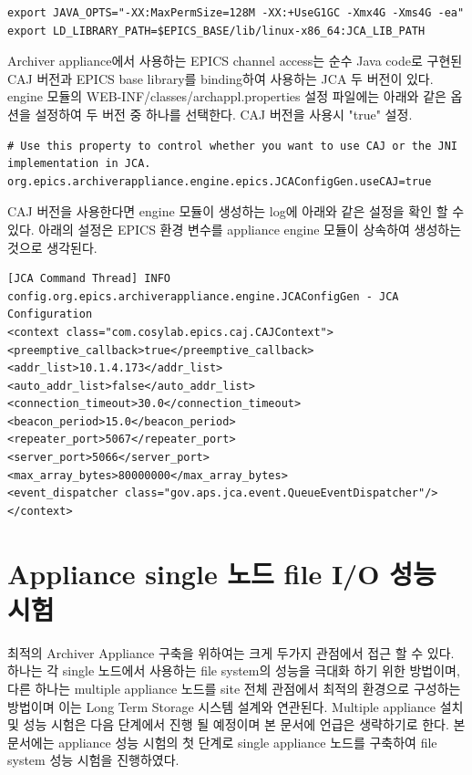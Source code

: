\documentclass[11pt
  , a4paper
  , article
  , oneside
]{memoir}
\begin{document}
\begin{lstlisting}[style=termstyle]
export JAVA_OPTS="-XX:MaxPermSize=128M -XX:+UseG1GC -Xmx4G -Xms4G -ea"
export LD_LIBRARY_PATH=$EPICS_BASE/lib/linux-x86_64:JCA_LIB_PATH
\end{lstlisting}

Archiver appliance에서 사용하는 EPICS channel access는 순수 Java code로 구현된 CAJ 버전과 EPICS base library를 binding하여 사용하는 JCA 두 버전이 있다. engine 모듈의 WEB-INF/classes/archappl.properties 설정 파일에는 아래와 같은 옵션을 설정하여 두 버전 중 하나를 선택한다. CAJ 버전을 사용시 "true" 설정.
\begin{lstlisting}[style=termstyle]
# Use this property to control whether you want to use CAJ or the JNI implementation in JCA.
org.epics.archiverappliance.engine.epics.JCAConfigGen.useCAJ=true
\end{lstlisting}
CAJ 버전을 사용한다면 engine 모듈이 생성하는 log에 아래와 같은 설정을 확인 할 수 있다. 아래의 설정은 EPICS 환경 변수를 appliance engine 모듈이 상속하여 생성하는 것으로 생각된다.

\begin{lstlisting}[style=termstyle]
[JCA Command Thread] INFO config.org.epics.archiverappliance.engine.JCAConfigGen - JCA Configuration
<context class="com.cosylab.epics.caj.CAJContext">
<preemptive_callback>true</preemptive_callback>
<addr_list>10.1.4.173</addr_list>
<auto_addr_list>false</auto_addr_list>
<connection_timeout>30.0</connection_timeout>
<beacon_period>15.0</beacon_period>
<repeater_port>5067</repeater_port>
<server_port>5066</server_port>
<max_array_bytes>80000000</max_array_bytes>
<event_dispatcher class="gov.aps.jca.event.QueueEventDispatcher"/>
</context>
\end{lstlisting}

\clearpage

\chapter{Appliance single 노드 file I/O 성능 시험}
최적의 Archiver Appliance 구축을 위하여는 크게 두가지 관점에서 접근 할 수 있다. 하나는 각 single 노드에서 사용하는 file system의 성능을 극대화 하기 위한 방법이며, 다른 하나는 multiple appliance 노드를 site 전체 관점에서 최적의 환경으로 구성하는 방법이며 이는 Long Term Storage 시스템 설계와 연관된다. Multiple appliance 설치 및 성능 시험은 다음 단계에서 진행 될 예정이며 본 문서에 언급은 생략하기로 한다. 본 문서에는 appliance 성능 시험의 첫 단계로 single appliance 노드를 구축하여 file system 성능 시험을 진행하였다.  
\end{document}

